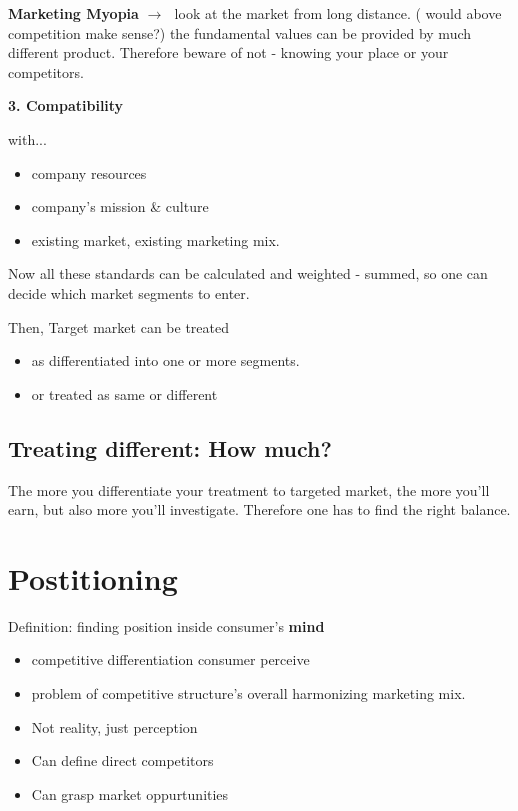 \documentclass[12pt]{article}
\newcommand{\ra}{$\rightarrow \text{ }$}
\newcommand{\tb}{\textbf}
\begin{document}
\begin{center}
	{\Large \textbf{Marketing Myopia}}
	\ra look at the market from long distance. ( would above competition make sense?)
	the fundamental values can be provided by much different product. Therefore beware of not - knowing your place or your competitors.
\end{center}

\tb{3. Compatibility}

with...
\begin{itemize}
	\item company resources
	\item company's mission \& culture
	\item existing market, existing marketing mix.
\end{itemize}

Now all these standards can be calculated and weighted - summed, so one can decide which market segments to enter.

Then, Target market can be treated
\begin{itemize}
	\item as differentiated into one or more segments.
	\item or treated as same or different
\end{itemize}

\subsection{Treating different: How much?}
The more you differentiate your treatment to targeted market, the more you'll earn, but also more you'll investigate. Therefore one has to find the right balance.


\section{Postitioning}
Definition: finding position inside consumer's \textbf{mind}

\begin{itemize}
	\item competitive differentiation consumer perceive
	\item problem of competitive structure's overall harmonizing marketing mix.
	\item Not reality, just perception
	\item Can define direct competitors
	\item Can grasp market oppurtunities
\end{itemize}
\end{document}
